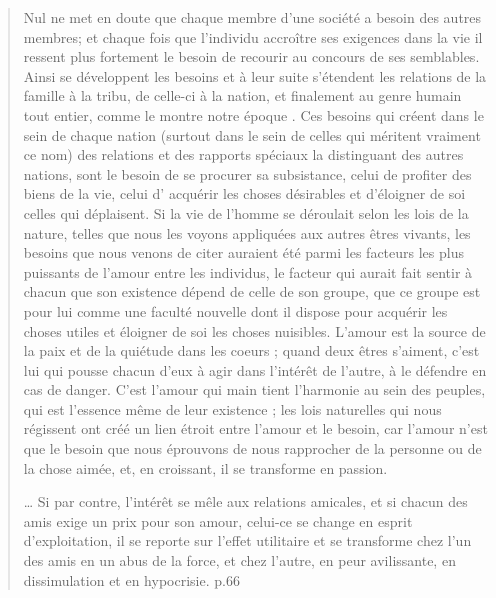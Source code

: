 \begin{quote}
    Nul ne met en doute que chaque membre d'une société a besoin
des autres membres; et chaque fois que l'individu accroître ses exigences
dans la vie il ressent plus fortement le besoin de recourir au concours
de ses semblables. Ainsi se développent les besoins et à leur suite s'étendent
les relations de la famille à la tribu, de celle-ci à la nation, et finalement
au genre humain tout entier, comme le montre notre époque . Ces
besoins qui créent dans le sein de chaque nation (surtout dans le sein de
celles qui méritent vraiment ce nom) des relations et des rapports
spéciaux la distinguant des autres nations, sont le besoin de se procurer
sa subsistance, celui de profiter des biens de la vie, celui d' acquérir
les choses désirables et d'éloigner de soi celles qui déplaisent. 
Si la vie de l'homme se déroulait selon les lois de la nature, telles
que nous les voyons appliquées aux autres êtres vivants, les besoins
que nous venons de citer auraient été parmi les facteurs les plus puissants
de l'amour entre les individus, le facteur qui aurait fait sentir à chacun
que son existence dépend de celle de son groupe, que ce groupe est pour lui comme une faculté nouvelle dont il dispose pour acquérir les
choses utiles et éloigner de soi les choses nuisibles. L'amour est la source
de la paix et de la quiétude dans les coeurs ; quand deux êtres s'aiment,
c'est lui qui pousse chacun d'eux à agir dans l'intérêt de l'autre, à le défendre en cas de danger.  C'est l'amour qui main tient l'harmonie au
sein des peuples, qui est l'essence même de leur existence ; les lois naturelles qui nous régissent ont créé un lien étroit entre l'amour et le besoin,
car l'amour n'est que le besoin que nous éprouvons de nous rapprocher de la personne ou de la chose aimée, et, en croissant, il se transforme en passion.

\ldots
Si par contre, l'intérêt se mêle aux relations amicales, et si chacun des amis exige un prix pour son amour, celui-ce se change en esprit d'exploitation, il se reporte sur l'effet utilitaire et se transforme chez l'un des amis en un abus de la force, et chez l'autre, en peur avilissante, en dissimulation et en hypocrisie.
p.66
\end{quote}

